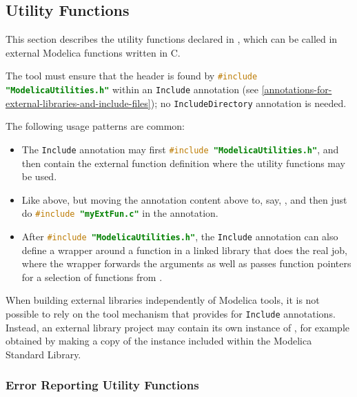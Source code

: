\subsection{Utility Functions}\label{utility-functions}

This section describes the utility functions declared in , which can be called in external Modelica functions written in C.

The tool must ensure that the header is found by \lstinline[language=C]!#include "ModelicaUtilities.h"! within an \lstinline!Include! annotation (see \cref{annotations-for-external-libraries-and-include-files}); no \lstinline!IncludeDirectory! annotation is needed.

\begin{example}
The following usage patterns are common:
\begin{itemize}
\item
  The \lstinline!Include! annotation may first \lstinline[language=C]!#include "ModelicaUtilities.h"!, and then contain the external function definition where the utility functions may be used.
\item
  Like above, but moving the annotation content above to, say, , and then just do \lstinline[language=C]!#include "myExtFun.c"! in the annotation.
\item
  After \lstinline[language=C]!#include "ModelicaUtilities.h"!, the \lstinline!Include! annotation can also define a wrapper around a function in a linked library that does the real job, where the wrapper forwards the arguments as well as passes function pointers for a selection of functions from .
\end{itemize}
\end{example}

\begin{nonnormative}
When building external libraries independently of Modelica tools, it is not possible to rely on the tool mechanism that provides  for \lstinline!Include! annotations.
Instead, an external library project may contain its own instance of , for example obtained by making a copy of the instance included within the Modelica Standard Library.
\end{nonnormative}


\subsubsection{Error Reporting Utility Functions}\label{utility-functions-for-reporting-errors}\label{error-reporting-utility-functions}

